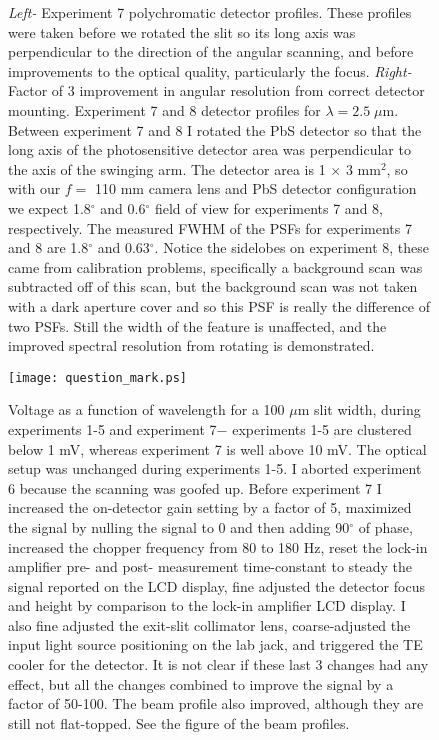 \begin{figure}
  \centering
  \caption[Rotating the PbS detector improved the angular resolution by a factor of 3]{ \emph{Left-} Experiment 7 polychromatic detector profiles.  These profiles were taken before we rotated the slit so its long axis was perpendicular to the direction of the angular scanning, and before improvements to the optical quality, particularly the focus.  \emph{Right-} Factor of 3 improvement in angular resolution from correct detector mounting. Experiment 7 and 8 detector profiles for $\lambda = 2.5 \; \mu$m.  Between experiment 7 and 8 I rotated the PbS detector so that the long axis of the photosensitive detector area was perpendicular to the axis of the swinging arm.  The detector area is 1 $\times$ 3 mm$^{2}$, so with our $f=$ 110 mm camera lens and PbS detector configuration we expect 1.8$^\circ$ and 0.6$^\circ$ field of view for experiments 7 and 8, respectively.  The measured FWHM of the PSFs for experiments 7 and 8 are 1.8$^\circ$ and 0.63$^\circ$.  Notice the sidelobes on experiment 8, these came from calibration problems, specifically a background scan was subtracted off of this scan, but the background scan was not taken with a dark aperture cover and so this PSF is really the difference of two PSFs.  Still the width of the feature is unaffected, and the improved spectral resolution from rotating is demonstrated.}
\end{figure}


\begin{figure}
\begin{center}
    \texttt{[image: question\_mark.ps]}
  \end{center}
  \caption[Factor of 50-100 improvement in signal from optical and electronic improvements]{Voltage as a function of wavelength for a 100 $\mu$m slit width, during experiments 1-5 and experiment 7$-$ experiments 1-5 are clustered below 1 mV, whereas experiment 7 is well above 10 mV.  The optical setup was unchanged during experiments 1-5.  I aborted experiment 6 because the scanning was goofed up.  Before experiment 7 I increased the on-detector gain setting by a factor of 5, maximized the signal by nulling the signal to 0 and then adding 90$^\circ$ of phase, increased the chopper frequency from 80 to 180 Hz, reset the lock-in amplifier pre- and post- measurement time-constant to steady the signal reported on the LCD display, fine adjusted the detector focus and height by comparison to the lock-in amplifier LCD display.  I also fine adjusted the exit-slit collimator lens, coarse-adjusted the input light source positioning on the lab jack, and triggered the TE cooler for the detector.  It is not clear if these last 3 changes had any effect, but all the changes combined to improve the signal by a factor of 50-100.  The beam profile also improved, although they are still not flat-topped.  See the figure of the beam profiles.}
\end{figure}






